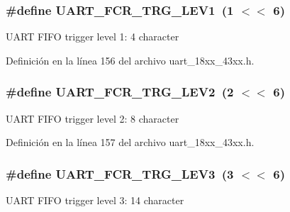 \subsubsection[{\texorpdfstring{U\+A\+R\+T\+\_\+\+F\+C\+R\+\_\+\+T\+R\+G\+\_\+\+L\+E\+V1}{UART_FCR_TRG_LEV1}}]{\setlength{\rightskip}{0pt plus 5cm}\#define U\+A\+R\+T\+\_\+\+F\+C\+R\+\_\+\+T\+R\+G\+\_\+\+L\+E\+V1~(1 $<$$<$ 6)}\hypertarget{group___u_a_r_t__18_x_x__43_x_x_ga264238c2dde9248a73d679c32a74004b}{}\label{group___u_a_r_t__18_x_x__43_x_x_ga264238c2dde9248a73d679c32a74004b}
U\+A\+RT F\+I\+FO trigger level 1\+: 4 character 

Definición en la línea 156 del archivo uart\+\_\+18xx\+\_\+43xx.\+h.

\subsubsection[{\texorpdfstring{U\+A\+R\+T\+\_\+\+F\+C\+R\+\_\+\+T\+R\+G\+\_\+\+L\+E\+V2}{UART_FCR_TRG_LEV2}}]{\setlength{\rightskip}{0pt plus 5cm}\#define U\+A\+R\+T\+\_\+\+F\+C\+R\+\_\+\+T\+R\+G\+\_\+\+L\+E\+V2~(2 $<$$<$ 6)}\hypertarget{group___u_a_r_t__18_x_x__43_x_x_ga7b655aba90b695210e7ce9f7b00cea89}{}\label{group___u_a_r_t__18_x_x__43_x_x_ga7b655aba90b695210e7ce9f7b00cea89}
U\+A\+RT F\+I\+FO trigger level 2\+: 8 character 

Definición en la línea 157 del archivo uart\+\_\+18xx\+\_\+43xx.\+h.

\subsubsection[{\texorpdfstring{U\+A\+R\+T\+\_\+\+F\+C\+R\+\_\+\+T\+R\+G\+\_\+\+L\+E\+V3}{UART_FCR_TRG_LEV3}}]{\setlength{\rightskip}{0pt plus 5cm}\#define U\+A\+R\+T\+\_\+\+F\+C\+R\+\_\+\+T\+R\+G\+\_\+\+L\+E\+V3~(3 $<$$<$ 6)}\hypertarget{group___u_a_r_t__18_x_x__43_x_x_ga9e6ef12c7a1f3514d6e30d7548ed3e46}{}\label{group___u_a_r_t__18_x_x__43_x_x_ga9e6ef12c7a1f3514d6e30d7548ed3e46}
U\+A\+RT F\+I\+FO trigger level 3\+: 14 character 

